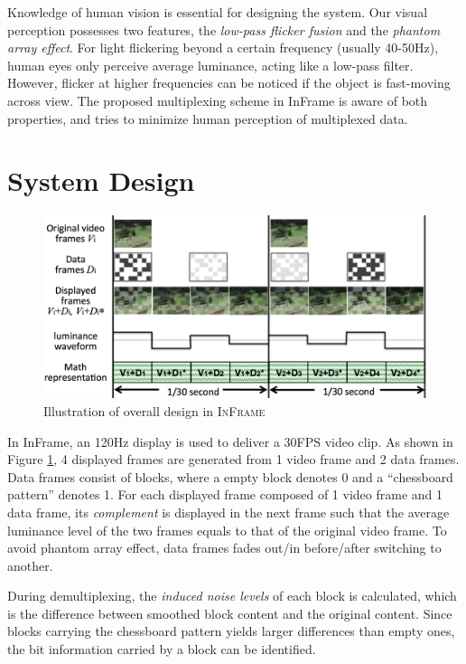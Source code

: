 \documentclass{acm_proc_article-sp}
\begin{document}
Knowledge of human vision is essential for designing the system. Our visual perception possesses two features, the \textit{low-pass flicker fusion} and the \textit{phantom array effect}. For light flickering beyond a certain frequency (usually 40-50Hz), human eyes only perceive average luminance, acting like a low-pass filter. However, flicker at higher frequencies can be noticed if the object is fast-moving across view. The proposed multiplexing scheme in InFrame is aware of both properties, and tries to minimize human perception of multiplexed data.

\section{System Design}

\begin{figure}[!h]
    \centering
    \includegraphics[width=\linewidth]{figures/design}
    \caption{Illustration of overall design in \textsc{InFrame}}
    \label{fig:design}
\end{figure}

In InFrame, an 120Hz display is used to deliver a 30FPS video clip. As shown in Figure \ref{fig:design}, 4 displayed frames are generated from 1 video frame and 2 data frames. Data frames consist of blocks, where a empty block denotes 0 and a ``chessboard pattern'' denotes 1. For each displayed frame composed of 1 video frame and 1 data frame, its \textit{complement} is displayed in the next frame such that the average luminance level of the two frames equals to that of the original video frame. To avoid phantom array effect, data frames fades out/in before/after switching to another.

During demultiplexing, the \textit{induced noise levels} of each block is calculated, which is the difference between smoothed block content and the original content. Since blocks carrying the chessboard pattern yields larger differences than empty ones, the bit information carried by a block can be identified.



\end{document}
